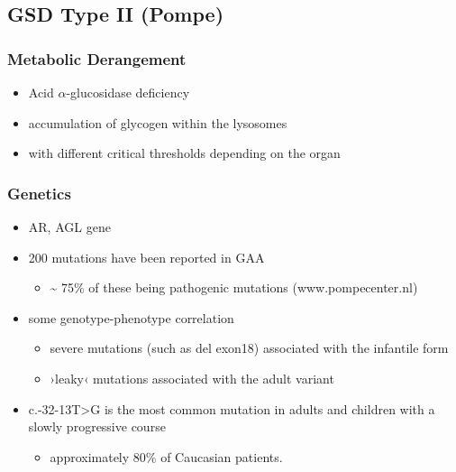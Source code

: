 \documentclass{scrartcl}
\begin{document}
\subsection{GSD Type II (Pompe)}
\label{sec:org69e8446}
\subsubsection{Metabolic Derangement}
\label{sec:org77ae754}
\begin{itemize}
\item Acid \(\alpha\)-glucosidase deficiency
\item accumulation of glycogen within the lysosomes
\item with different critical thresholds depending on the organ
\end{itemize}

\subsubsection{Genetics}
\label{sec:org16c2d52}
\begin{itemize}
\item AR, AGL gene
\item 200 mutations have been reported in GAA
\begin{itemize}
\item \textasciitilde{} 75\% of these being pathogenic mutations (www.pompecenter.nl)
\end{itemize}
\item some genotype-phenotype correlation
\begin{itemize}
\item severe mutations (such as del exon18) associated with the infantile form
\item ›leaky‹ mutations associated with the adult variant
\end{itemize}
\item c.-32-13T>G is the most common mutation in adults and children with
a slowly progressive course
\begin{itemize}
\item approximately 80\% of Caucasian patients.
\end{itemize}
\end{itemize}
\end{document}
